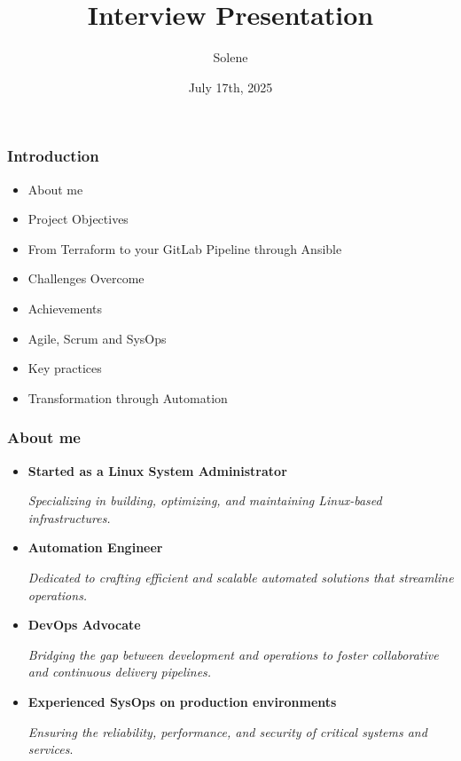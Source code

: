 \documentclass{beamer}
\title{Interview Presentation}
\author{Solene}
\date{July 17th, 2025}
\begin{document}
\frame{\titlepage}

\begin{frame}
\frametitle{Introduction}
\begin{itemize}
    \item About me
    \item Project Objectives
    \item From Terraform to your GitLab Pipeline through Ansible
    \item Challenges Overcome
    \item Achievements
    \item Agile, Scrum and SysOps
    \item Key practices
    \item Transformation through Automation
\end{itemize}
\end{frame}

\begin{frame}
\frametitle{About me}
\begin{itemize}
    \item \textbf{Started as a Linux System Administrator}  
    \begin{itemize}
        \textit{Specializing in building, optimizing, and maintaining Linux-based infrastructures.}
    \end{itemize}

    \item \textbf{Automation Engineer}  
    \begin{itemize}
        \textit{Dedicated to crafting efficient and scalable automated solutions that streamline operations.}
    \end{itemize}

    \item \textbf{DevOps Advocate}  
    \begin{itemize}
        \textit{Bridging the gap between development and operations to foster collaborative and continuous delivery pipelines.}
    \end{itemize}

    \item \textbf{Experienced SysOps on production environments}  
    \begin{itemize}
        \textit{Ensuring the reliability, performance, and security of critical systems and services}.  \end{itemize}
\end{itemize}
\end{frame}
\end{document}
